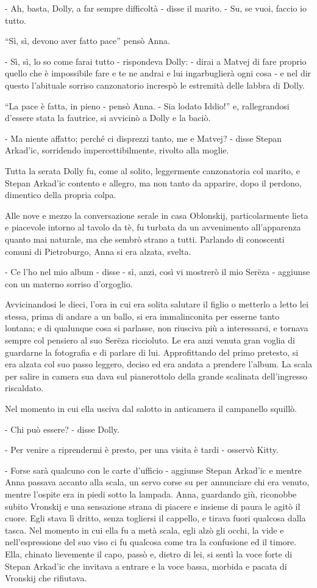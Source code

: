 - Ah, basta, Dolly, a far sempre difficoltà - disse il marito. - Su, se vuoi, faccio io tutto. 

``Sì, sì, devono aver fatto pace'' pensò Anna. 

- Sì, sì, lo so come farai tutto - rispondeva Dolly: - dirai a Matvej di fare proprio quello che è impossibile fare e te ne andrai e lui ingarbuglierà ogni cosa - e nel dir questo l'abituale sorriso canzonatorio increspò le estremità delle labbra di Dolly. 

``La pace è fatta, in pieno - pensò Anna. - Sia lodato Iddio!'' e, rallegrandosi d'essere stata la fautrice, si avvicinò a Dolly e la baciò. 

- Ma niente affatto; perché ci disprezzi tanto, me e Matvej? - disse Stepan Arkad'ic, sorridendo impercettibilmente, rivolto alla moglie. 

Tutta la serata Dolly fu, come al solito, leggermente canzonatoria col marito, e Stepan Arkad'ic contento e allegro, ma non tanto da apparire, dopo il perdono, dimentico della propria colpa. 

Alle nove e mezzo la conversazione serale in casa Oblonskij, particolarmente lieta e piacevole intorno al tavolo da tè, fu turbata da un avvenimento all'apparenza quanto mai naturale, ma che sembrò strano a tutti. Parlando di conoscenti comuni di Pietroburgo, Anna si era alzata, svelta. 

- Ce l'ho nel mio album - disse - sì, anzi, così vi mostrerò il mio Serëza - aggiunse con un materno sorriso d'orgoglio. 

Avvicinandosi le dieci, l'ora in cui era solita salutare il figlio o metterlo a letto lei stessa, prima di andare a un ballo, si era immalinconita per esserne tanto lontana; e di qualunque cosa si parlasse, non riusciva più a interessarsi, e tornava sempre col pensiero al suo Serëza riccioluto. Le era anzi venuta gran voglia di guardarne la fotografia e di parlare di lui. Approfittando del primo pretesto, si era alzata col suo passo leggero, deciso ed era andata a prendere l'album. La scala per salire in camera sua dava sul pianerottolo della grande scalinata dell'ingresso riscaldato. 

Nel momento in cui ella usciva dal salotto in anticamera il campanello squillò. 

- Chi può essere? - disse Dolly. 

- Per venire a riprendermi è presto, per una visita è tardi - osservò Kitty. 

- Forse sarà qualcuno con le carte d'ufficio - aggiunse Stepan Arkad'ic e mentre Anna passava accanto alla scala, un servo corse su per annunciare chi era venuto, mentre l'ospite era in piedi sotto la lampada. Anna, guardando giù, riconobbe subito Vronskij e una sensazione strana di piacere e insieme di paura le agitò il cuore. Egli stava lì dritto, senza togliersi il cappello, e tirava fuori qualcosa dalla tasca. Nel momento in cui ella fu a metà scala, egli alzò gli occhi, la vide e nell'espressione del suo viso ci fu qualcosa come tra la confusione ed il timore. Ella, chinato lievemente il capo, passò e, dietro di lei, si sentì la voce forte di Stepan Arkad'ic che invitava a entrare e la voce bassa, morbida e pacata di Vronskij che rifiutava. 

